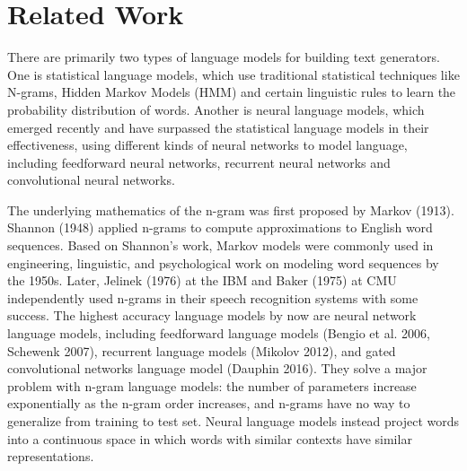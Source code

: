 \documentclass{article}
\begin{document}
\section{Related Work}
There are primarily two types of language models for building text generators. One is statistical language models, which use traditional statistical techniques like N-grams, Hidden Markov Models (HMM) and certain linguistic rules to learn the probability distribution of words. Another is neural language models, which emerged recently and have surpassed the statistical language models in their effectiveness, using different kinds of neural networks to model language, including feedforward neural networks, recurrent neural networks and convolutional neural networks.

The underlying mathematics of the n-gram was first proposed by Markov (1913). Shannon (1948) applied n-grams to compute approximations to English word sequences. Based on Shannon's work, Markov models were commonly used in engineering, linguistic, and psychological work on modeling word sequences by the 1950s. Later, Jelinek (1976) at the IBM and Baker (1975) at CMU independently used n-grams in their speech recognition systems with some success. The highest accuracy language models by now are neural network language models, including feedforward language models (Bengio et al. 2006, Schewenk 2007), recurrent language models (Mikolov 2012), and gated convolutional networks language model (Dauphin 2016). They solve a major problem with n-gram language models: the number of parameters increase exponentially as the n-gram order increases, and n-grams have no way to generalize from training to test set. Neural language models instead project words into a continuous space in which words with similar contexts have similar representations.
\end{document}
